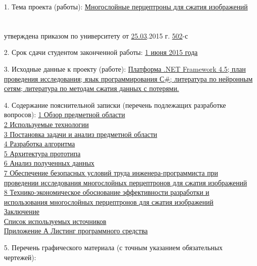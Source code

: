 {  1. Тема проекта (работы):
  \uline{Многослойные перцептроны для сжатия изображений}\lineunderscore\\
  \lineunderscore\\
  \lineunderscore\\
  утверждена приказом по университету от \uline{25.03}.2015 г.  \textnumero \uline{502}-с

  \vspace{1em}

  2. Срок сдачи студентом законченной работы: \uline{1 июня 2015 года}\lineunderscore

  \vspace{1em}

  3. Исходные данные к проекту (работе):
  \uline{Платформа .NET Framework 4.5; план проведения исследования; язык программирования С\#; литература по нейронным сетям; литература по методам сжатия данных с потерями.}\lineunderscore\\
  \lineunderscore

  \vspace{1em}

  4. Содержание пояснительной записки (перечень подлежащих разработке вопросов):
  \uline{1 Обзор предметной области}\lineunderscore\\
  \uline{2 Используемые технологии}\lineunderscore\\
  \uline{3 Постановка задачи и анализ предметной области}\lineunderscore\\
  \uline{4 Разработка алгоритма}\lineunderscore\\
  \uline{5 Архитектура прототипа}\lineunderscore\\
  \uline{6 Анализ полученных данных}\lineunderscore\\
  \uline{7 Обеспечение безопасных условий труда инженера-программиста при проведении исследования многослойных перцептронов для сжатия изображений}\lineunderscore\\
  \uline{8 Технико-экономическое обоснование эффективности разработки и использования многослойных перцептронов для сжатия изображений}\lineunderscore\\
  \uline{Заключение}\lineunderscore\\
  \uline{Список используемых источников}\lineunderscore\\
  \uline{Приложение А Листинг программного средства}\lineunderscore

  \clearpage
  \thispagestyle{empty}

  5. Перечень графического материала (с точным указанием обязательных чертежей):
  \lineunderscore\\
  \lineunderscore\\
  \lineunderscore\\
  \lineunderscore\\
  \lineunderscore\\
  \lineunderscore\\
  \lineunderscore\\
  \lineunderscore

}
